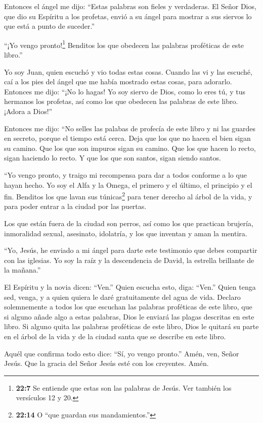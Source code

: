  Entonces el ángel me dijo: ``Estas palabras son fieles y
verdaderas. El Señor Dios, que dio su Espíritu a los profetas, envió a
su ángel para mostrar a sus siervos lo que está a punto de suceder.''

 ``¡Yo vengo pronto!\footnote{\textbf{22:7} Se entiende que
  estas son las palabras de Jesús. Ver también los versículos 12 y 20.}
Benditos los que obedecen las palabras proféticas de este libro.''

 Yo soy Juan, quien escuchó y vio todas estas cosas. Cuando
las vi y las escuché, caí a los pies del ángel que me había mostrado
estas cosas, para adorarlo.  Entonces me dijo: ``¡No lo
hagas! Yo soy siervo de Dios, como lo eres tú, y tus hermanos los
profetas, así como los que obedecen las palabras de este libro. ¡Adora a
Dios!''

 Entonces me dijo: ``No selles las palabas de profecía de
este libro y ni las guardes en secreto, porque el tiempo está cerca.
 Deja que los que no hacen el bien sigan su camino. Que los
que son impuros sigan su camino. Que los que hacen lo recto, sigan
haciendo lo recto. Y que los que son santos, sigan siendo santos.

 ``Yo vengo pronto, y traigo mi recompensa para dar a todos
conforme a lo que hayan hecho.  Yo soy el Alfa y la Omega,
el primero y el último, el principio y el fin.  Benditos
los que lavan sus túnicas\footnote{\textbf{22:14} O ``que guardan sus
  mandamientos.''} para tener derecho al árbol de la vida, y para poder
entrar a la ciudad por las puertas.

 Los que están fuera de la ciudad son perros, así como los
que practican brujería, inmoralidad sexual, asesinato, idolatría, y los
que inventan y aman la mentira.

 ``Yo, Jesús, he enviado a mi ángel para darte este
testimonio que debes compartir con las iglesias. Yo soy la raíz y la
descendencia de David, la estrella brillante de la mañana.''

 El Espíritu y la novia dicen: ``Ven.'' Quien escucha esto,
diga: ``Ven.'' Quien tenga sed, venga, y a quien quiera le daré
gratuitamente del agua de vida.  Declaro solemnemente a
todos los que escuchan las palabras proféticas de este libro, que si
alguno añade algo a estas palabras, Dios le enviará las plagas descritas
en este libro.  Si alguno quita las palabras proféticas de
este libro, Dios le quitará su parte en el árbol de la vida y de la
ciudad santa que se describe en este libro.

 Aquél que confirma todo esto dice: ``Sí, yo vengo
pronto.'' Amén, ven, Señor Jesús.  Que la gracia del Señor
Jesús esté con los creyentes. Amén.
